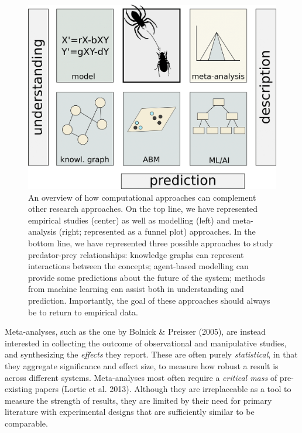 \documentclass[12pt]{article}
\begin{document}
\begin{figure}
\centering
\includegraphics{figures/concept.png}
\caption{An overview of how computational approaches can complement
other research approaches. On the top line, we have represented
empirical studies (center) as well as modelling (left) and meta-analysis
(right; represented as a funnel plot) approaches. In the bottom line, we
have represented three possible approaches to study predator-prey
relationships: knowledge graphs can represent interactions between the
concepts; agent-based modelling can provide some predictions about the
future of the system; methods from machine learning can assist both in
understanding and prediction. Importantly, the goal of these approaches
should always be to return to empirical data.\label{fig:concept}}
\end{figure}

Meta-analyses, such as the one by Bolnick \& Preisser (2005), are
instead interested in collecting the outcome of observational and
manipulative studies, and synthesizing the \emph{effects} they report.
These are often purely \emph{statistical}, in that they aggregate
significance and effect size, to measure how robust a result is across
different systems. Meta-analyses most often require a \emph{critical
mass} of pre-existing papers (Lortie et al. 2013). Although they are
irreplaceable as a tool to measure the strength of results, they are
limited by their need for primary literature with experimental designs
that are sufficiently similar to be comparable.
\end{document}
